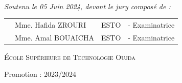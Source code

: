 \begin{center}
\begin{minipage}{0.4\textwidth}
\vspace{1cm}

\end{minipage}\\[0.6cm]

{\large \textit{Soutenu le 05 Juin 2024, devant le jury composé de : }}\\[0.5cm]


\begin{tabular}{p{1cm}lll}
 & \large Mme. Hafida \textsc{ZROURI}  & \large ESTO & \large - Examinatrice \mbox{\hspace{2.3em}}\\[0.1cm]
 & \large Mme. Amal \textsc{BOUAICHA}  & \large ESTO & \large - Examinatrice \\[0.1cm]
 
\end{tabular}

\vspace{1.5cm}


\textsc{École Supérieure de Technologie Oujda}

{\large Promotion : 2023/2024}
   
\end{center}


